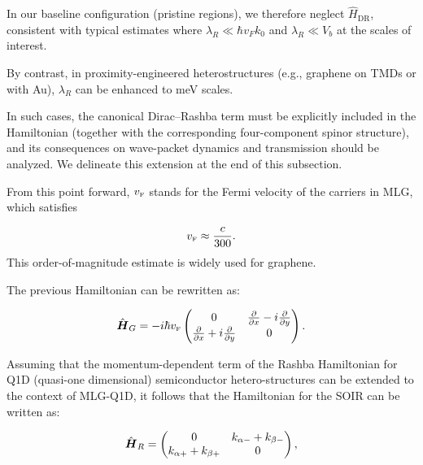 In our baseline configuration (pristine regions), we therefore neglect $\hat{H}_{\mathrm{DR}}$, consistent with typical estimates where $\lambda_R \ll \hbar v_F k_0$ and $\lambda_R \ll V_b$ at the scales of interest.

By contrast, in proximity-engineered heterostructures (e.g., graphene on TMDs or with Au), $\lambda_R$ can be enhanced to meV scales\cite{AvsarNatCommun2014, WangPhysRevX2016}.

In such cases, the canonical Dirac--Rashba term must be explicitly included in the Hamiltonian (together with the corresponding four-component spinor structure), and its consequences on wave-packet dynamics and transmission should be analyzed. We delineate this extension at the end of this subsection.


From this point forward, $v_{\mbox{\tiny F}}$ stands for the Fermi velocity of the carriers in MLG, which satisfies

\begin{equation}
    \label{eq:vF}
    v_{\mbox{\tiny F}} \approx \frac{c}{300}.
\end{equation}
This order-of-magnitude estimate is widely used for graphene\cite{Geimk2007}.

The previous Hamiltonian can be rewritten as:

\begin{equation}
    \label{eq:pristineGrapheneMatrix}
    \hat{\mbox{\boldmath $H$}}_G = -i\hbar v_{\mbox{\tiny F}}
    \begin{pmatrix}
        0                                                         & \frac{\partial}{\partial x}- i\frac{\partial}{\partial y} \\
        \frac{\partial}{\partial x}+ i\frac{\partial}{\partial y} & 0
    \end{pmatrix}.
\end{equation}

Assuming that the momentum-dependent term of the Rashba Hamiltonian for Q1D (quasi-one dimensional) semiconductor hetero-structures can be extended to the context of MLG-Q1D\cite{RDiago2010, Serna2019, RCDiagoEPL2015}, it follows that the Hamiltonian for the SOIR can be written as:

\begin{equation}
    \label{eq:SOIRHamiltonian}
    \hat{\mbox{\boldmath $H$}}_R =
    \begin{pmatrix}
        0 & k_{\alpha-} + k_{\beta-} \\
        k_{\alpha+} + k_{\beta+} & 0
    \end{pmatrix},
\end{equation}

